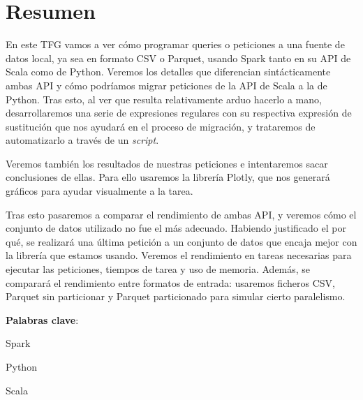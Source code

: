 \documentclass[12pt,twoside,titlepage]{report}
\newcommand\blankpage{%
    \newpage
    \null
    \thispagestyle{empty}%
    \newpage}
\begin{document}
\afterpage{\blankpage}








\chapter*{Resumen}

En este TFG vamos a ver cómo programar queries o peticiones a una fuente de datos local, ya sea en formato CSV o Parquet, usando Spark tanto en su API de Scala como de Python. Veremos los detalles que diferencian sintácticamente ambas API y cómo podríamos migrar peticiones de la API de Scala a la de Python. Tras esto, al ver que resulta relativamente arduo hacerlo a mano, desarrollaremos una serie de expresiones regulares con su respectiva expresión de sustitución que nos ayudará en el proceso de migración, y trataremos de automatizarlo a través de un \textit{script}.

Veremos también los resultados de nuestras peticiones e intentaremos sacar conclusiones de ellas. Para ello usaremos la librería Plotly, que nos generará gráficos para ayudar visualmente a la tarea.

Tras esto pasaremos a comparar el rendimiento de ambas API, y veremos cómo el conjunto de datos utilizado no fue el más adecuado. Habiendo justificado el por qué, se realizará una última petición a un conjunto de datos que encaja mejor con la librería que estamos usando. Veremos el rendimiento en tareas necesarias para ejecutar las peticiones, tiempos de tarea y uso de memoria. Además, se comparará el rendimiento entre formatos de entrada: usaremos ficheros CSV, Parquet sin particionar y Parquet particionado para simular cierto paralelismo.

\mbox{} \bigskip

\noindent \textbf{Palabras clave}:
\begin{compactitem}
    \item Spark
    \item Python
    \item Scala
\end{compactitem}

\afterpage{\blankpage}

\end{document}
